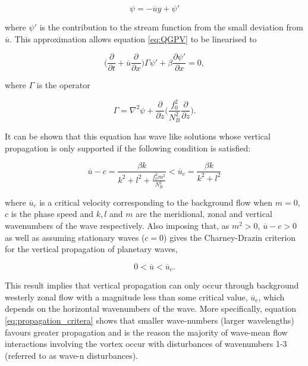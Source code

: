 \begin{equation} \label{eq:Zonal_flow_SF}
\psi = -\overline{u} y + \psi '
\end{equation}

\noindent where $\psi'$ is the contribution to the stream function from the small deviation from $\overline{u}$. This approximation allows equation \ref{eq:QGPV} to be linearised to

\begin{equation} \label{eq:Linearised_QGPV}
\bigg(\frac{\partial}{\partial t} + \overline{u} \frac{\partial}{\partial x}\bigg)\Gamma \psi' + \beta \frac{\partial \psi'}{\partial x} = 0,
\end{equation}

\noindent where $\Gamma$ is the operator

\begin{equation} \label{eq:ellipse_operator}
\Gamma = \nabla^2 \psi + \frac{\partial}{\partial z}\bigg(\frac{f_0^2}{N_B^2}\frac{\partial}{\partial z}\bigg).
\end{equation}

It can be shown that this equation has wave like solutions whose vertical propagation is only supported if the following condition is satisfied:

\begin{equation} \label{eq:propagation_critera}
\overline{u} - c = \frac{\beta k}{k^2 + l^2 + \frac{f_0^2 m^2}{N_B^2}} < \overline{u}_c = \frac{\beta k}{k^2 + l^2}
\end{equation}

\noindent where $\overline{u}_c$ is a critical velocity corresponding to the background flow when $m = 0$, $c$ is the phase speed and $k, l$ and $m$ are the meridional, zonal and vertical wavenumbers of the wave respectively. Also imposing that, as $m^2 > 0$, $\overline{u} - c > 0$ as well as assuming stationary waves ($c = 0$) gives the Charney-Drazin criterion for the vertical propagation of planetary waves,

\begin{equation} \label{eq:Charney-Drazin}
0 < \overline{u} < \overline{u}_c.
\end{equation}

This result implies that vertical propagation can only occur through background westerly zonal flow with a magnitude less than some critical value, $\overline{u}_c$, which depends on the horizontal wavenumbers of the wave. More specifically, equation \ref{eq:propagation_critera} shows that smaller wave-numbers (larger wavelengths) favours greater propagation and is the reason the majority of wave-mean flow interactions involving the vortex occur with disturbances of wavenumbers 1-3 (referred to as wave-n disturbances). 


